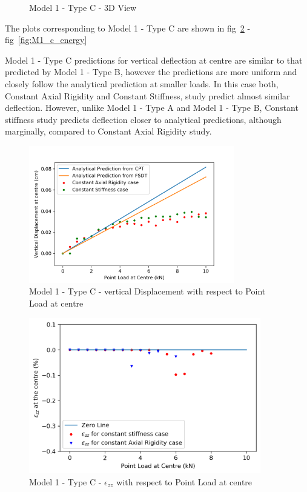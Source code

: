 \begin{figure}[!htbp]
\begin{minipage}{0.3\textwidth}
    \caption{Model 1 - Type C - 3D View}
    \label{fig:M1_c_3D}
\end{minipage}
\end{figure}

The plots corresponding to Model 1 - Type C are shown in fig~\ref{fig:M1_c_plt} - fig~\ref{fig:M1_c_energy}


Model 1 - Type C predictions for vertical deflection at centre are similar to that predicted by Model 1 - Type B, however the predictions are more uniform and closely follow the analytical prediction at smaller loads. In this case both, Constant Axial Rigidity and Constant Stiffness, study predict almost similar deflection. However, unlike Model 1 - Type A and Model 1 - Type B, Constant stiffness study predicts deflection closer to analytical predictions, although marginally, compared to Constant Axial Rigidity study.

\begin{figure}[!htbp]
    \centering
    \includegraphics[width = 0.8\textwidth]{Figures/M1_c_plt.png}
    \caption{Model 1 - Type C - vertical Displacement with respect to Point Load at centre}
    \label{fig:M1_c_plt}
\end{figure}

\begin{figure}[!htbp]
    \centering
    \includegraphics[width = 0.9\textwidth]{Figures/M1_c_strain.png}
    \caption{Model 1 - Type C - $\epsilon_{zz}$ with respect to Point Load at centre}
    \label{fig:M1_c_strain_plt}
\end{figure}

